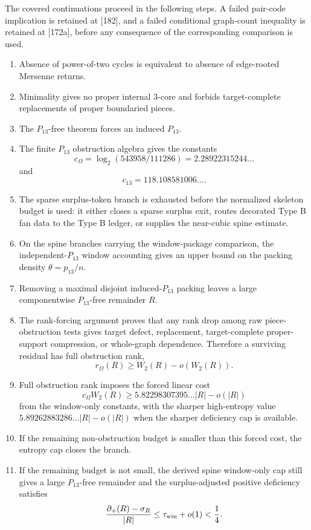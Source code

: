 \documentclass[11pt]{article}
\newcommand{\defp}{\partial_+}
\begin{document}
The covered continuations proceed in the following steps.  A failed
pair-code implication is retained at [182], and a failed conditional
graph-count inequality is retained at [172a], before any consequence of
the corresponding comparison is used.
\begin{enumerate}[label=(\arabic*)]
\item Absence of power-of-two cycles is equivalent to absence of edge-rooted Mersenne returns.
\item Minimality gives no proper internal $3$-core and forbids target-complete replacements of proper boundaried pieces.
\item The $P_{13}$-free theorem forces an induced $P_{13}$.
\item The finite $P_{13}$ obstruction algebra gives the constants
\[
 c_\Omega=\log_2(543958/111286)=2.28922315244\ldots
\]
and
\[
 c_{13}=118.108581006\ldots .
\]
\item The sparse surplus-token branch is exhausted before the normalized
skeleton budget is used: it either closes a sparse surplus exit, routes
decorated Type B fan data to the Type B ledger, or supplies the near-cubic
spine estimate.
\item On the spine branches carrying the window-package comparison, the
independent-$P_{13}$ window accounting gives an upper bound on the packing
density $\theta=p_{13}/n$.
\item Removing a maximal disjoint induced-$P_{13}$ packing leaves a large componentwise $P_{13}$-free remainder $R$.
\item The rank-forcing argument proves that any rank drop among raw piece-obstruction tests gives target defect, replacement, target-complete proper-support compression, or whole-graph dependence.  Therefore a surviving residual has full obstruction rank,
\[
 r_\Omega(R)\ge W_2(R)-o(W_2(R)).
\]
\item Full obstruction rank imposes the forced linear cost
\[
 c_\Omega W_2(R)\ge 5.82298307395\ldots |R|-o(|R|)
\]
from the window-only constants, with the sharper high-entropy value
$5.89262883286\ldots |R|-o(|R|)$ when the sharper deficiency cap is available.
\item If the remaining non-obstruction budget is smaller than this forced cost, the entropy cap closes the branch.
\item If the remaining budget is not small, the derived spine window-only cap
still gives a large $P_{13}$-free remainder and the surplus-adjusted positive
deficiency satisfies
\[
\frac{\defp(R)-\sigma_R}{|R|}\le \tau_{\rm win}+o(1)<\frac14.
\]
\end{enumerate}
\end{document}
